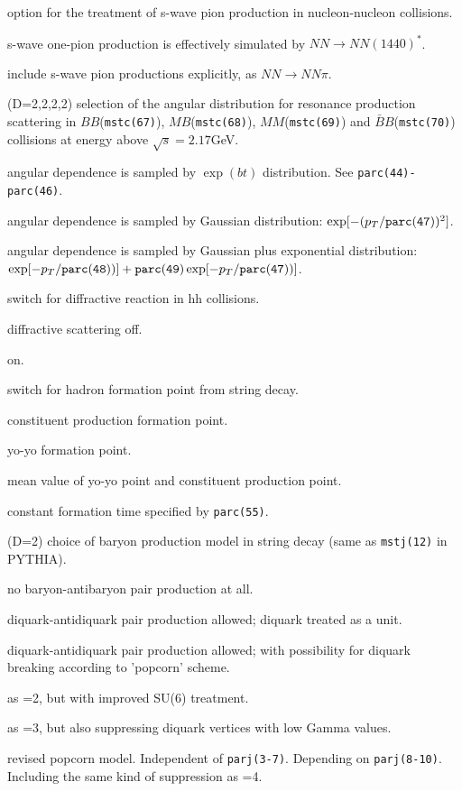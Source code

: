 \documentclass[]{article}
\newenvironment{entry}%
{\begin{list}{}{\setlength{\topsep}{0mm} \setlength{\itemsep}{0mm}
\setlength{\parskip}{0mm} \setlength{\parsep}{0mm}
\setlength{\leftmargin}{20mm} \setlength{\rightmargin}{0mm}
\setlength{\labelwidth}{18mm} \setlength{\labelsep}{2mm}}}%
{\end{list}}
\newenvironment{subentry}%
{\begin{list}{}{\setlength{\topsep}{0mm} \setlength{\itemsep}{0mm}
\setlength{\parskip}{0mm} \setlength{\parsep}{0mm}
\setlength{\leftmargin}{10mm} \setlength{\rightmargin}{0mm}
\setlength{\labelwidth}{18mm} \setlength{\labelsep}{2mm}}}%
{\end{list}}
\newcommand{\ttt}[1]{{\tt#1}}
\newcommand{\itemt}[1]{\item[{\tt #1}\hfill]}
\newcommand{\srt}{\mbox{$\sqrt{s}$}}
\newcommand{\Bbar}{\mbox{$\bar B$}}
\begin{document}
\begin{entry}
\itemt{mstc(66)(D=0) :} option for the treatment of s-wave pion production
   in nucleon-nucleon collisions. 
 \begin{subentry}
    \itemt{$=0$ :} s-wave one-pion production is effectively simulated by
        $NN \to NN(1440)^*$.
    \itemt{$=1$ :} include s-wave pion productions explicitly,
                   as $NN\to NN\pi$.
 \end{subentry}

\itemt{mstc(67),mstc(68),mstc(69),mstc(70) :} (D=2,2,2,2)
     selection of the angular distribution for
     resonance production scattering in $BB$(\ttt{mstc(67)}),
     $MB$(\ttt{mstc(68)}), $MM$(\ttt{mstc(69)}) and $\Bbar B$(\ttt{mstc(70)})
     collisions at energy above $\srt=2.17$GeV.
 \begin{subentry}
    \itemt{$=2$ :} angular dependence is sampled by $\exp(bt)$ distribution.
                   See \ttt{parc(44)-parc(46)}.
    \itemt{$=4$ :} angular dependence is sampled by Gaussian distribution:
                   $\exp[-(p_T/\ttt{parc(47)})^2]$.
    \itemt{$=5$ :} angular dependence is sampled by Gaussian plus
                    exponential distribution:
        $\exp[-p_T/\ttt{parc(48)})]+\ttt{parc(49)}\exp[-p_T/\ttt{parc(47)})]$.
 \end{subentry}
\medskip

\itemt{mstc(71)(D=1) :} switch for diffractive reaction in hh collisions.
 \begin{subentry}
    \itemt{$=0$ :} diffractive scattering off.
    \itemt{$=1$ :} on.
 \end{subentry}

\itemt{mstc(72)(D=2) :} switch for hadron formation point from string decay.
 \begin{subentry}
    \itemt{$=1$:} constituent production formation point.
    \itemt{$=2$:} yo-yo formation point.
    \itemt{$=3$:} mean value of yo-yo point and constituent production point.
    \itemt{$=4$:} constant formation time specified by \ttt{parc(55)}.
 \end{subentry}

\itemt{mstc(73):}(D=2) choice of baryon production model in string decay
    (same as \ttt{mstj(12)} in PYTHIA).
 \begin{subentry}
   \itemt{$=0$ :} no baryon-antibaryon pair production at all.
   \itemt{$=1$ :} diquark-antidiquark pair production allowed; diquark
                  treated as a unit.
   \itemt{$=2$ :} diquark-antidiquark pair production allowed;
           with possibility for diquark breaking according to 'popcorn' scheme.
   \itemt{$=3$ :} as =2, but with improved SU(6) treatment.
   \itemt{$=4$ :} as =3, but also suppressing diquark vertices with low Gamma
                  values.
   \itemt{$=5$ :} revised popcorn model. Independent of \ttt{parj(3-7)}.
                  Depending on \ttt{parj(8-10)}. Including the same kind of
                 suppression as =4.
 \end{subentry}


\end{entry}
\end{document}
